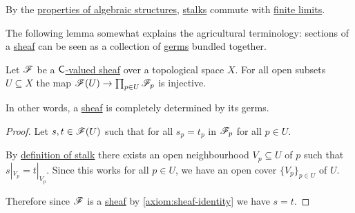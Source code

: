 \documentclass[../../main]{subfiles}
\begin{document}
\begin{remark}\label{rem:stalk-commute-finite-limits}
  By the \hyperref[lemma:algebraic-structure-properties]{properties of algebraic structures}, \hyperref[def:stalk]{stalks} commute with \hyperref[def:categorical-limit]{finite limits}.
\end{remark}

The following lemma somewhat explains the agricultural terminology: sections of a \hyperref[def:sheaf]{sheaf} can be seen as a collection of \hyperref[def:stalk]{germs} bundled together.
\begin{lemma}\label{lemma:sheaf-determined-by-germs}
  Let \(\mathscr{F}\) be a \hyperref[def:sheaf]{\(\mathsf{C}\)-valued sheaf} over a topological space \(X\).
  For all open subsets \(U \subseteq X\) the map \(\mathscr{F}(U) \to \prod_{p \in U} \mathscr{F}_{p}\) is injective.

  In other words, a \hyperref[def:sheaf]{sheaf} is completely determined by its germs.
\end{lemma}
\begin{proof}
  Let \(s, t \in \mathscr{F}(U)\) such that for all \(s_{p} = t_{p}\) in \(\mathscr{F}_{p}\) for all \(p \in U\).

  By \hyperref[def:stalk]{definition of stalk} there exists an open neighbourhood \(V_{p} \subseteq U\) of \(p\) such that \(s|_{V_{p}} = t|_{V_{p}}\).
  Since this works for all \(p \in U\), we have an open cover \(\{V_{p}\}_{p \in U}\) of \(U\).

  Therefore since \(\mathscr{F}\) is a \hyperref[def:sheaf]{sheaf} by \ref{axiom:sheaf-identity} we have \(s = t\).
\end{proof}
\end{document}
